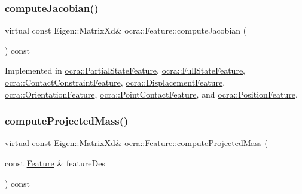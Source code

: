 \hypertarget{classocra_1_1Feature_adbab3b388657555abb805bb971c2491f}{}\label{classocra_1_1Feature_adbab3b388657555abb805bb971c2491f} 
\subsubsection{\texorpdfstring{compute\+Jacobian()}{computeJacobian()}\hspace{0.1cm}{\footnotesize\ttfamily [2/2]}}
{\footnotesize\ttfamily virtual const Eigen\+::\+Matrix\+Xd\& ocra\+::\+Feature\+::compute\+Jacobian (\begin{DoxyParamCaption}{ }\end{DoxyParamCaption}) const\hspace{0.3cm}{\ttfamily [pure virtual]}}



Implemented in \hyperlink{classocra_1_1PartialStateFeature_a134ada6399c8f4bda311844c79cd5467}{ocra\+::\+Partial\+State\+Feature}, \hyperlink{classocra_1_1FullStateFeature_a9f1b50d69d0a5220286e9a7c3fb54835}{ocra\+::\+Full\+State\+Feature}, \hyperlink{classocra_1_1ContactConstraintFeature_aa3c6131d9c4c815e9e9ec5ab50407b21}{ocra\+::\+Contact\+Constraint\+Feature}, \hyperlink{classocra_1_1DisplacementFeature_a87e2abee5d1072e142dcab99193699da}{ocra\+::\+Displacement\+Feature}, \hyperlink{classocra_1_1OrientationFeature_abcbc478b32843cc055c3b7002ce91e7c}{ocra\+::\+Orientation\+Feature}, \hyperlink{classocra_1_1PointContactFeature_a969bbe345edbcf6abecdd863630faa3f}{ocra\+::\+Point\+Contact\+Feature}, and \hyperlink{classocra_1_1PositionFeature_a15ec85661a0c18620f9214a375066cdd}{ocra\+::\+Position\+Feature}.

\hypertarget{classocra_1_1Feature_a44e11dd349e92971fefebff354e7214b}{}\label{classocra_1_1Feature_a44e11dd349e92971fefebff354e7214b} 
\subsubsection{\texorpdfstring{compute\+Projected\+Mass()}{computeProjectedMass()}\hspace{0.1cm}{\footnotesize\ttfamily [1/2]}}
{\footnotesize\ttfamily virtual const Eigen\+::\+Matrix\+Xd\& ocra\+::\+Feature\+::compute\+Projected\+Mass (\begin{DoxyParamCaption}\item[{const \hyperlink{classocra_1_1Feature}{Feature} \&}]{feature\+Des }\end{DoxyParamCaption}) const\hspace{0.3cm}{\ttfamily [pure virtual]}}



